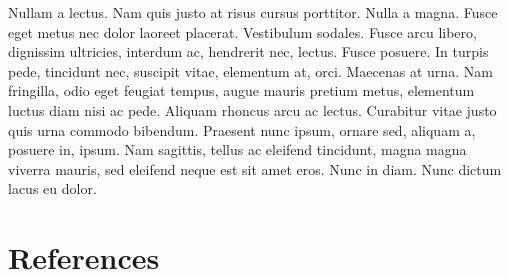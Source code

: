 Nullam a lectus. Nam quis justo at risus cursus porttitor. Nulla a magna. Fusce eget metus nec dolor laoreet placerat. Vestibulum sodales. Fusce arcu libero, dignissim ultricies, interdum ac, hendrerit nec, lectus. Fusce posuere. In turpis pede, tincidunt nec, suscipit vitae, elementum at, orci. Maecenas at urna. Nam fringilla, odio eget feugiat tempus, augue mauris pretium metus, elementum luctus diam nisi ac pede. Aliquam rhoncus arcu ac lectus. Curabitur vitae justo quis urna commodo bibendum. Praesent nunc ipsum, ornare sed, aliquam a, posuere in, ipsum. Nam sagittis, tellus ac eleifend tincidunt, magna magna viverra mauris, sed eleifend neque est sit amet eros. Nunc in diam. Nunc dictum lacus eu dolor.


\chapter{References}

%

\thesisvita


 